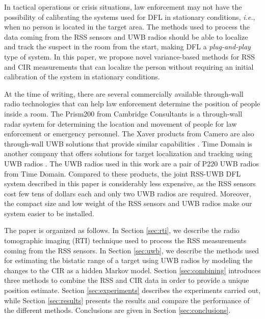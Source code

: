 \documentclass[conference]{IEEEtran}
\begin{document}
In tactical operations or crisis situations, law enforcement may not
have the possibility of calibrating the systems used for DFL in
stationary conditions, \emph{i.e.}, when no person is located in the
target area. The methods used to process the data coming from the RSS
sensors and UWB radios should be able to localize and track the
suspect in the room from the start, making DFL a \emph{plug-and-play}
type of system. In this paper, we propose novel variance-based methods
for RSS and CIR measurements that can localize the person without
requiring an initial calibration of the system in stationary
conditions.

At the time of writing, there are several commercially available
through-wall radio technologies that can help law enforcement
determine the position of people inside a room. The Prism200 from
Cambridge Consultants \cite{Cambridge} is a through-wall radar system
for determining the location and movement of people for law
enforcement or emergency personnel. The Xaver\texttrademark\; products
from Camero are also through-wall UWB solutions that provide similar
capabilities \cite{Camero}. Time Domain is another company that offers
solutions for target localization and tracking using UWB radios
\cite{TD}. The UWB radios used in this work are a pair of P220 UWB
radios from Time Domain. Compared to these products, the joint RSS-UWB
DFL system described in this paper is considerably less expensive, as
the RSS sensors cost few tens of dollars each and only two UWB radios
are required. Moreover, the compact size and low weight of the RSS
sensors and UWB radios make our system easier to be installed.





The paper is organized as follows. In Section \ref{sec:rti}, we
describe the radio tomographic imaging (RTI) technique used to process
the RSS measurements coming from the RSS sensors. In Section
\ref{sec:uwb}, we describe the methods used for estimating the
bistatic range of a target using UWB radios by modeling the changes to
the CIR as a hidden Markov model. Section \ref{sec:combining}
introduces three methods to combine the RSS and CIR data in order to
provide a unique position estimate. Section \ref{sec:experiments}
describes the experiments carried out, while Section \ref{sec:results}
presents the results and compare the performance of the different
methods. Conclusions are given in Section \ref{sec:conclusions}.
\end{document}

